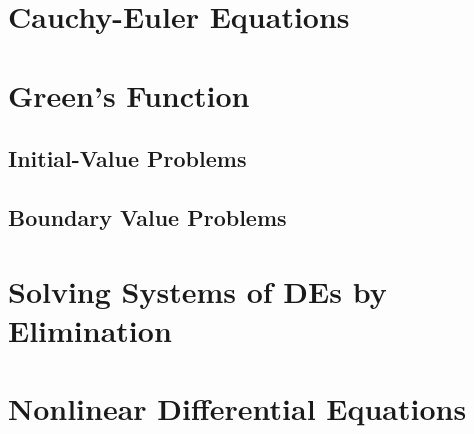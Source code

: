 \documentclass[./Differential Equations]{subfiles}
\begin{document}
	\section{Cauchy-Euler Equations}
	\section{Green's Function}
		\subsection{Initial-Value Problems}
		\subsection{Boundary Value Problems}
	\section{Solving Systems of DEs by Elimination}
	\section{Nonlinear Differential Equations}
\end{document}
